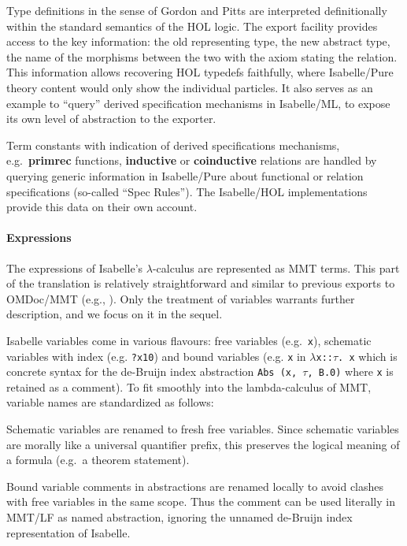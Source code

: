 Type definitions in the sense of Gordon and
  Pitts \cite{pitts93} are interpreted
  definitionally within the standard semantics of the HOL
  logic. The export facility provides access to the key
  information: the old representing type, the new abstract type, the
  name of the morphisms between the two with the axiom stating the
  relation.
  This information allows recovering HOL typedefs faithfully, where
  Isabelle/Pure theory content would only show the individual
  particles. It also serves as an example to ``query'' derived
  specification mechanisms in Isabelle/ML, to expose its own level of
  abstraction to the exporter.
  
Term constants with indication of derived specifications
  mechanisms, e.g.\ \textbf{primrec} functions, \textbf{inductive} or
  \textbf{coinductive} relations are handled by querying generic
  information in Isabelle/Pure about functional or relation
  specifications (so-called ``Spec Rules''). The Isabelle/HOL
  implementations provide this data on their own account.

\paragraph{Expressions}
The expressions of Isabelle's $\lambda$-calculus are represented as MMT terms.
This part of the translation is relatively straightforward and similar to previous exports to OMDoc/MMT (e.g., \cite{KalRab:hollight:14,KohMueOwr:mpagsiuf17,MueRabSac:cltg19}).
Only the treatment of variables warrants further description, and we focus on it in the sequel.

Isabelle variables come in various flavours: free variables (e.g.\
\verb,x,), schematic variables with index (e.g. \verb,?x10,) and bound
variables (e.g. \verb,x, in $\lambda$\verb,x::,$\tau$\verb,. x, which
is concrete syntax for the de-Bruijn index abstraction
\verb;Abs (x, ;$\tau$\verb;, B.0); where \verb,x, is retained as a
comment). To fit smoothly into the lambda-calculus of MMT, variable
names are standardized as follows:

Schematic variables are renamed to fresh free variables. Since
  schematic variables are morally like a universal quantifier prefix,
  this preserves the logical meaning of a formula (e.g.\ a theorem
  statement).

Bound variable comments in abstractions are renamed locally to
  avoid clashes with free variables in the same scope. Thus the
  comment can be used literally in MMT/LF as named abstraction,
  ignoring the unnamed de-Bruijn index representation of Isabelle.

